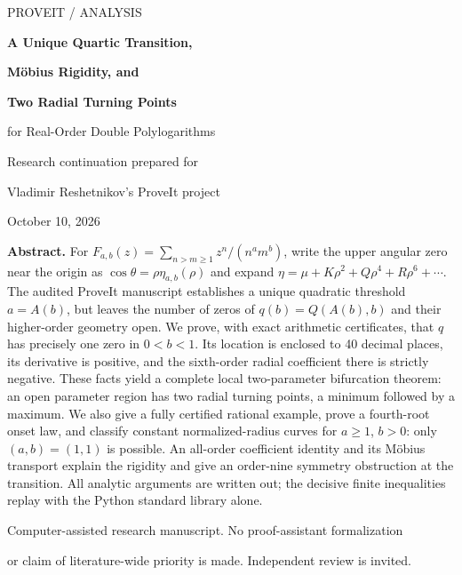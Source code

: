 \documentclass[11pt,a4paper]{article}
\theoremstyle{definition}\newtheorem{definition}[theorem]{Definition}
\theoremstyle{remark}\newtheorem{remark}[theorem]{Remark}
\numberwithin{equation}{section}
\begin{document}
\begin{titlepage}
\centering
\vspace*{14mm}
{\large PROVEIT \quad / \quad ANALYSIS\par}
\vspace{13mm}
{\huge\bfseries A Unique Quartic Transition,\par}
\vspace{3mm}
{\huge\bfseries M\"obius Rigidity, and\par}
\vspace{3mm}
{\huge\bfseries Two Radial Turning Points\par}
\vspace{8mm}
{\Large for Real-Order Double Polylogarithms\par}
\vspace{14mm}
{\large Research continuation prepared for\par}
\vspace{2mm}
{\Large Vladimir Reshetnikov's ProveIt project\par}
\vspace{6mm}
{October 10, 2026\par}
\vfill
\begin{minipage}{0.91\textwidth}
\textbf{Abstract.}
For $F_{a,b}(z)=\sum_{n>m\ge1}z^n/(n^a m^b)$, write the upper angular
zero near the origin as $\cos\theta=\rho\eta_{a,b}(\rho)$ and expand
$\eta=\mu+K\rho^2+Q\rho^4+R\rho^6+\cdots$.
The audited ProveIt manuscript establishes a unique quadratic threshold
$a=A(b)$, but leaves the number of zeros of $q(b)=Q(A(b),b)$ and their
higher-order geometry open. We prove, with exact arithmetic certificates,
that $q$ has precisely one zero in $0<b<1$. Its location is enclosed to
40 decimal places, its derivative is positive, and the sixth-order radial
coefficient there is strictly negative. These facts yield a complete local
two-parameter bifurcation theorem: an open parameter region has two radial
turning points, a minimum followed by a maximum. We also give a fully
certified rational example, prove a fourth-root onset law, and classify
constant normalized-radius curves for $a\ge1$, $b>0$: only $(a,b)=(1,1)$
is possible. An all-order coefficient identity and its M\"obius transport
explain the rigidity and give an order-nine symmetry obstruction at the
transition. All analytic arguments are written out; the decisive finite
inequalities replay with the Python standard library alone.
\end{minipage}
\vfill
{\small Computer-assisted research manuscript. No proof-assistant formalization\par
or claim of literature-wide priority is made. Independent review is invited.\par}
\end{titlepage}
\tableofcontents
\newpage


\end{document}

